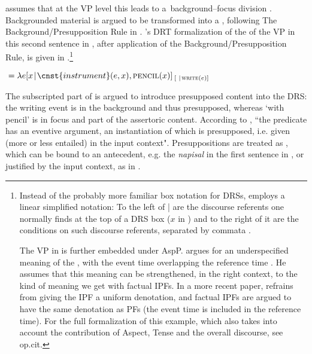 \documentclass[output=paper,modfonts,newtxmath,hidelinks
\ChapterDOI{10.5281/zenodo.2545513}
]{langscibook}
\begin{document}
\sloppy \noindent \citeauthor{gronndiss} assumes that at the VP level this  leads to a~background--focus division \citep[in the sense of][]{krifka01}. Backgrounded material is argued to be transformed into a , following The Background/Presupposition Rule in \citet{geurtssandt97}. \citeauthor{gronndiss}'s DRT formalization of the  of the VP in this second sentence in , after application of the Background/Presupposition Rule, is given in  \citep[][193]{gronndiss}.\footnote{Instead of the probably more familiar box notation for DRSs, \citeauthor{gronndiss} employs a linear simplified notation: To the left of | are the discourse referents one normally finds at the top of a DRS box ($x$ in ) and to the right of it are the conditions on such discourse referents, separated by commata \citep[for further discussion see][43]{gronndiss}. 

The VP in  is further embedded under AspP. \citet{gronndiss} argues for an underspecified meaning of the , with the event time overlapping the reference time  \citep[building on][]{klein95}. He assumes that this meaning can be strengthened, in the right context, to the kind of  meaning we get with factual IPFs. In a more recent paper, \citet{gronn15} refrains from giving the  IPF a uniform denotation, and factual IPFs are argued to have the same denotation as PFs (the event time is included in the reference time). For the full formalization of this example, which also takes into account the contribution of Aspect, Tense and the overall discourse, see op.cit.} 

\ea\label{gronnanalysis}
${}=\lambda e[x\hspace{0.1em} |\hspace{0.1em} \cnst{instrument}(e, x), \textsc{pencil}(x)]_{\hspace{2pt}[ \hspace{0.3em} |\hspace{0.1em}\textsc{write}(e)]}$
\z
	
\noindent The subscripted part of  is argued to introduce presupposed content into the DRS: the writing event is in the background and thus presupposed, whereas `with pencil' is in focus and part of the assertoric content. According to \citet[][192]{gronndiss}, ``the  predicate has an eventive argument, an instantiation of which is presupposed, i.e. given (more or less entailed) in the input context". Presuppositions are treated as , which can be bound to an antecedent, e.g. the  \textit{napisal} in the first sentence in , or justified by the input context, as in .
\end{document}
